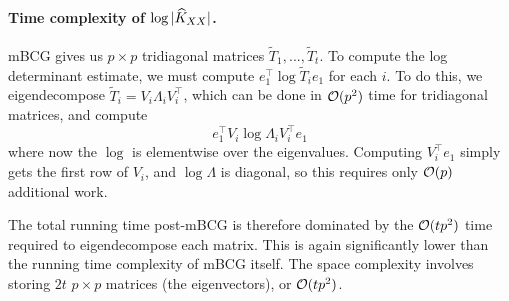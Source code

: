 \paragraph{Time complexity of $\log \vert \widehat{K}_{XX} \vert$.}
mBCG gives us $p \times p$ tridiagonal matrices  $\tilde{T}_{1},...,\tilde{T}_{t}$. To compute the log determinant estimate, we must compute $e_{1}^{\top}\log \tilde{T}_{i} e_{1}$ for each $i$. To do this, we eigendecompose $\tilde{T}_{i}=V_{i}\Lambda_{i}V_{i}^{\top}$, which can be done in $\bigo{p^{2}}$ time for tridiagonal matrices, and compute
\begin{equation}
  e_1^\top V_i\log \Lambda_i V_i^\top e_1
\end{equation}
where now the $\log$ is elementwise over the eigenvalues. Computing $V_i^\top e_1$ simply gets the first row of $V_i$, and $\log \Lambda$ is diagonal, so this requires only $\bigo{p}$ additional work.

The total running time post-mBCG is therefore dominated by the $\bigo{tp^{2}}$ time required to eigendecompose each matrix. This is again significantly lower than the running time complexity of mBCG itself. The space complexity involves storing $2t$ $p \times p$ matrices (the eigenvectors), or $\bigo{tp^{2}}$.
